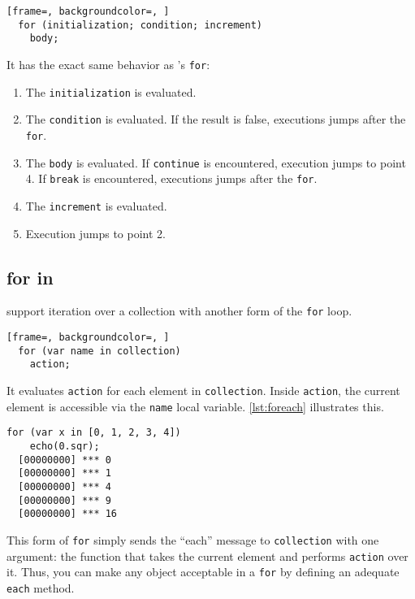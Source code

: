 \documentclass[openright,twoside,12pt]{report}
\begin{document}
\begin{lstlisting}[frame=, backgroundcolor=, ]
  for (initialization; condition; increment)
    body;
\end{lstlisting}

It has the exact same behavior as \C's \lstinline|for|:

\begin{enumerate}
\item The \lstinline|initialization| is evaluated.
\item The \lstinline|condition| is evaluated. If the result is false,
  executions jumps after the \lstinline|for|.
\item The \lstinline|body| is evaluated. If \lstinline|continue| is
  encountered, execution jumps to point 4. If \lstinline|break| is
  encountered, executions jumps after the \lstinline|for|.
\item The \lstinline|increment| is evaluated.
\item Execution jumps to point 2.
\end{enumerate}

\subsection{for in}

\us support iteration over a collection with another form of the
\lstinline|for| loop.

\begin{lstlisting}[frame=, backgroundcolor=, ]
  for (var name in collection)
    action;
\end{lstlisting}

It evaluates \lstinline|action| for each element in
\lstinline|collection|. Inside \lstinline|action|, the current element
is accessible via the \lstinline|name| local variable. \autoref{lst:foreach}
illustrates this.


\begin{lstlisting}[caption=Iterating over a collection with for, label=lst:foreach,
  float=\floatpos]
  for (var x in [0, 1, 2, 3, 4])
    echo(0.sqr);
  [00000000] *** 0
  [00000000] *** 1
  [00000000] *** 4
  [00000000] *** 9
  [00000000] *** 16
\end{lstlisting}

This form of \lstinline|for| simply sends the ``each'' message to
\lstinline|collection| with one argument: the function that takes the
current element and performs \lstinline|action| over it. Thus, you can
make any object acceptable in a \lstinline|for| by defining an
adequate \lstinline|each| method.
\end{document}
